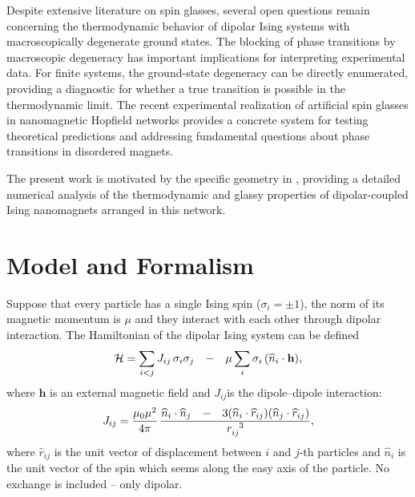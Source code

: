 \documentclass[
    aps,
    prb,
    reprint,           %
    superscriptaddress,%
    amsmath,amssymb,
    floatfix
]{revtex4-2}
\begin{document}
Despite extensive literature on spin glasses, several open questions remain concerning the thermodynamic behavior of dipolar Ising systems with macroscopically degenerate ground states. 
The blocking of phase transitions by macroscopic degeneracy has important implications for interpreting experimental data. For finite systems, the ground-state degeneracy can be directly enumerated, providing a diagnostic for whether a true transition is possible in the thermodynamic limit.
The recent experimental realization of artificial spin glasses in nanomagnetic Hopfield networks provides a concrete system for testing theoretical predictions and addressing fundamental questions about phase transitions in disordered magnets.

The present work is motivated by the specific geometry in \cite{Saccone2022}, providing a detailed numerical analysis of the thermodynamic and glassy properties of dipolar-coupled Ising nanomagnets arranged in this network.   

\section{Model and Formalism}
\label{sec:model}

Suppose that every particle has a single Ising spin ($\sigma _i=\pm 1$), the norm of its magnetic momentum is $\mu$ and they interact with each other through dipolar interaction. The Hamiltonian of the dipolar Ising system can be defined 
\begin{equation}
\mathcal{H}=\sum_{i<j} J_{ij}\text{\,}{\sigma }_i{\sigma }_j\text{\; \,}-\text{\; \,}\mu \sum_i {\sigma }_i\text{\,}({\widehat{n}}_i\cdot \mathbf{h}), 	
 \label{eq:ham1}
\end{equation}
where $\mathbf{h}$ is an external magnetic field and $J_{ij}$is the dipole–dipole interaction:
\begin{equation}
J_{ij}=\frac{{\mu }_{0}{\mu }^{2}}{4\pi }\text{\,}\frac{{\widehat{n}}_i\cdot {\widehat{n}}_j\text{\; \,}-\text{\; \,}3({\widehat{n}}_i\cdot {\widehat{r}}_{ij})({\widehat{n}}_j\cdot {\widehat{r}}_{ij})}{r_{ij}^{\text{\; \,}3}},	
 \label{eq:dipterm}
\end{equation}
where ${\widehat{r}}_{ij}$ is the unit vector of displacement between $i$ and $j$-th particles and ${\widehat{n}}_i$ is the unit vector of the spin which seems along the easy axis of the particle. No exchange is included – only dipolar.
\end{document}
